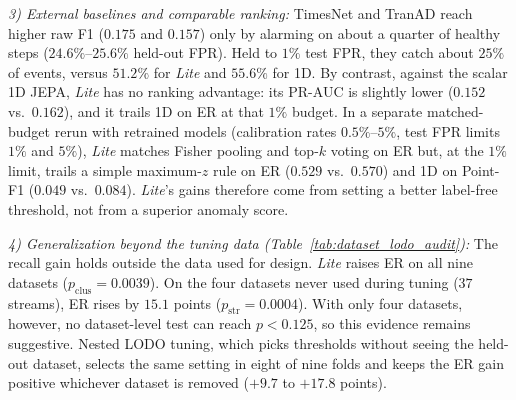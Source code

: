 \noindent\emph{3) External baselines and comparable ranking:} TimesNet and TranAD reach higher raw F1 ($0.175$ and $0.157$) only by alarming on about a quarter of healthy steps ($24.6\%\text{--}25.6\%$ held-out FPR). Held to $1\%$ test FPR, they catch about $25\%$ of events, versus $51.2\%$ for \emph{Lite} and $55.6\%$ for 1D. By contrast, against the scalar 1D JEPA, \emph{Lite} has no ranking advantage: its PR-AUC is slightly lower ($0.152$ vs.\ $0.162$), and it trails 1D on ER at that $1\%$ budget. In a separate matched-budget rerun with retrained models (calibration rates $0.5\%\text{--}5\%$, test FPR limits $1\%$ and $5\%$), \emph{Lite} matches Fisher pooling and top-$k$ voting on ER but, at the $1\%$ limit, trails a simple maximum-$z$ rule on ER ($0.529$ vs.\ $0.570$) and 1D on Point-F1 ($0.049$ vs.\ $0.084$). \emph{Lite}'s gains therefore come from setting a better label-free threshold, not from a superior anomaly score.

\noindent\emph{4) Generalization beyond the tuning data (Table~\ref{tab:dataset_lodo_audit}):} The recall gain holds outside the data used for design. \emph{Lite} raises ER on all nine datasets ($p_{\text{clus}}=0.0039$). On the four datasets never used during tuning ($37$ streams), ER rises by $15.1$ points ($p_{\text{str}}=0.0004$). With only four datasets, however, no dataset-level test can reach $p<0.125$, so this evidence remains suggestive. Nested LODO tuning, which picks thresholds without seeing the held-out dataset, selects the same setting in eight of nine folds and keeps the ER gain positive whichever dataset is removed ($+9.7$ to $+17.8$ points).

